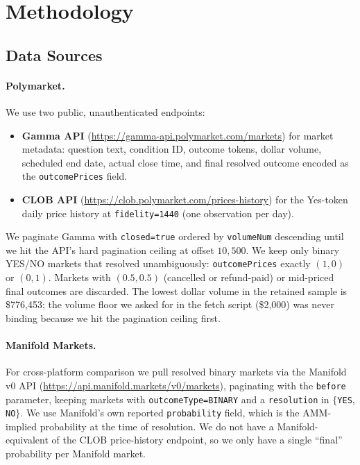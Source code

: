 \documentclass{article}
\begin{document}
\section{Methodology}

\subsection{Data Sources}

\paragraph{Polymarket.} We use two public, unauthenticated endpoints:
\begin{itemize}
  \item \textbf{Gamma API} (\url{https://gamma-api.polymarket.com/markets})
    for market metadata: question text, condition ID, outcome tokens,
    dollar volume, scheduled end date, actual close time, and final
    resolved outcome encoded as the \texttt{outcomePrices} field.
  \item \textbf{CLOB API}
    (\url{https://clob.polymarket.com/prices-history}) for the Yes-token
    daily price history at \texttt{fidelity=1440} (one observation per
    day).
\end{itemize}
We paginate Gamma with \texttt{closed=true} ordered by
\texttt{volumeNum} descending until we hit the API's hard pagination
ceiling at offset $10{,}500$. We keep only binary YES/NO markets that
resolved unambiguously: \texttt{outcomePrices} exactly $(1,0)$ or
$(0,1)$. Markets with $(0.5, 0.5)$ (cancelled or refund-paid) or
mid-priced final outcomes are discarded. The lowest dollar volume in
the retained sample is \$776{,}453; the volume floor we asked for in
the fetch script (\$2{,}000) was never binding because we hit the
pagination ceiling first.

\paragraph{Manifold Markets.} For cross-platform comparison we pull
resolved binary markets via the Manifold v0 API
(\url{https://api.manifold.markets/v0/markets}), paginating with the
\texttt{before} parameter, keeping markets with
\texttt{outcomeType=BINARY} and a \texttt{resolution} in
$\{$\texttt{YES}, \texttt{NO}$\}$. We use Manifold's own reported
\texttt{probability} field, which is the AMM-implied probability at the
time of resolution. We do not have a Manifold-equivalent of the CLOB
price-history endpoint, so we only have a single ``final'' probability
per Manifold market.
\end{document}
